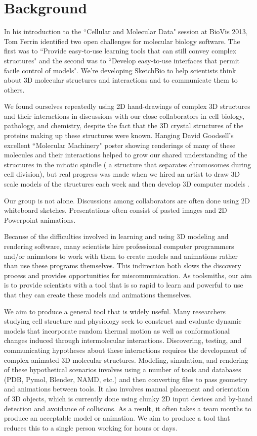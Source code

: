 \documentclass[twocolumn]{bmcart}%
\begin{document}
\section*{Background}

In his introduction to the ``Cellular and Molecular Data" session at BioVis 2013, Tom Ferrin identified two open challenges for molecular biology software.
The first was to ``Provide easy-to-use learning tools that can still convey complex structures" and the second was to ``Develop easy-to-use interfaces that permit facile control of models".
We’re developing SketchBio to help scientists think about 3D molecular structures and interactions and to communicate them to others.

We found ourselves repeatedly using 2D hand-drawings of complex 3D structures and their interactions in discussions with our close collaborators in cell biology, pathology, and chemistry, despite the fact that the 3D crystal structures of the proteins making up these structures were known.
Hanging David Goodsell's excellent ``Molecular Machinery" poster \cite{Goodsell} showing renderings of many of these molecules and their interactions helped to grow our shared understanding of the structures in the mitotic spindle ( a structure that separates chromosomes during cell division), but real progress was made when we hired an artist to draw 3D scale models of the structures each week and then develop 3D computer models \cite{taylor2012}.

Our group is not alone.  Discussions among collaborators are often done using 2D whiteboard sketches.  Presentations often consist of pasted images and 2D Powerpoint animations.

Because of the difficulties involved in learning and using 3D modeling and rendering software, many scientists hire professional computer programmers and/or animators to work with them to create models and animations rather than use these programs themselves.
This indirection both slows the discovery process and provides opportunities for miscommunication.
As toolsmiths, our aim is to provide scientists with a tool that is so rapid to learn and powerful to use that they can create these models and animations themselves.

We aim to produce a general tool that is widely useful.  Many researchers studying cell structure and physiology seek to construct and evaluate dynamic models that incorporate random thermal motion as well as conformational changes induced through intermolecular interactions.
Discovering, testing, and communicating hypotheses about these interactions requires the development of complex animated 3D molecular structures. Modeling, simulation, and rendering of these hypothetical scenarios involves using a number of tools and databases (PDB, Pymol, Blender, NAMD, etc.) and then converting files to pass geometry and animations between tools. It also involves manual placement and orientation of 3D objects, which is currently done using clunky 2D input devices and by-hand detection and avoidance of collisions. As a result, it often takes a team months to produce an acceptable model or animation.
We aim to produce a tool that reduces this to a single person working for hours or days.
\end{document}
